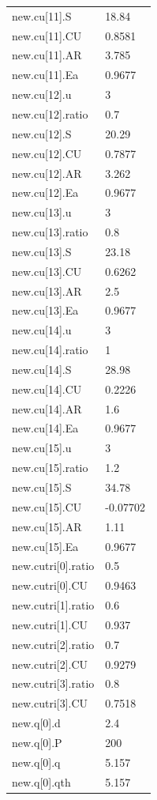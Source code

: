 {\begin{longtable}{p{}p{}}
{}new.cu[11].S & 18.84\\
{}new.cu[11].CU & 0.8581\\
{}new.cu[11].AR & 3.785\\
{}new.cu[11].Ea & 0.9677\\
{}new.cu[12].u & 3\\
{}new.cu[12].ratio & 0.7\\
{}new.cu[12].S & 20.29\\
{}new.cu[12].CU & 0.7877\\
{}new.cu[12].AR & 3.262\\
{}new.cu[12].Ea & 0.9677\\
{}new.cu[13].u & 3\\
{}new.cu[13].ratio & 0.8\\
{}new.cu[13].S & 23.18\\
{}new.cu[13].CU & 0.6262\\
{}new.cu[13].AR & 2.5\\
{}new.cu[13].Ea & 0.9677\\
{}new.cu[14].u & 3\\
{}new.cu[14].ratio & 1\\
{}new.cu[14].S & 28.98\\
{}new.cu[14].CU & 0.2226\\
{}new.cu[14].AR & 1.6\\
{}new.cu[14].Ea & 0.9677\\
{}new.cu[15].u & 3\\
{}new.cu[15].ratio & 1.2\\
{}new.cu[15].S & 34.78\\
{}new.cu[15].CU & -0.07702\\
{}new.cu[15].AR & 1.11\\
{}new.cu[15].Ea & 0.9677\\
{}new.cutri[0].ratio & 0.5\\
{}new.cutri[0].CU & 0.9463\\
{}new.cutri[1].ratio & 0.6\\
{}new.cutri[1].CU & 0.937\\
{}new.cutri[2].ratio & 0.7\\
{}new.cutri[2].CU & 0.9279\\
{}new.cutri[3].ratio & 0.8\\
{}new.cutri[3].CU & 0.7518\\
{}new.q[0].d & 2.4\\
{}new.q[0].P & 200\\
{}new.q[0].q & 5.157\\
{}new.q[0].qth & 5.157\\

\end{longtable}}
